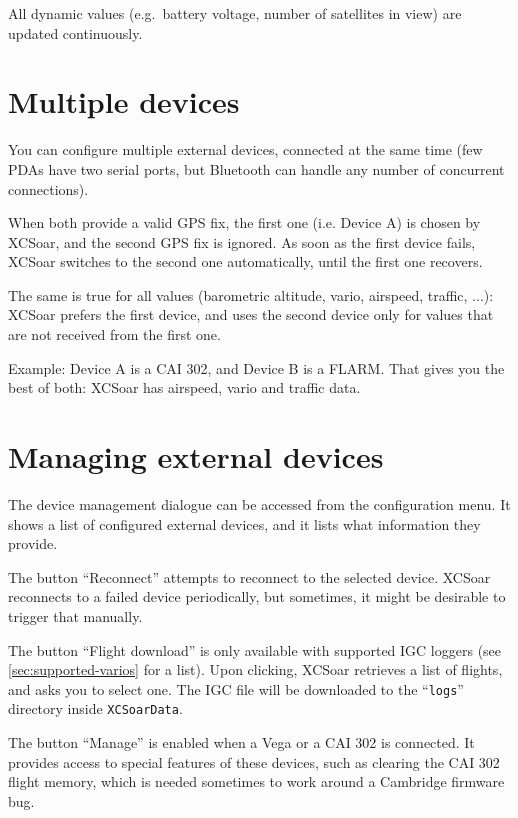 All dynamic values (e.g.\ battery voltage, number of satellites in
view) are updated continuously.

\section{Multiple devices}

You can configure multiple external devices, connected at the same
time (few PDAs have two serial ports, but Bluetooth can handle any
number of concurrent connections).

When both provide a valid GPS fix, the first one (i.e. Device A) is chosen by
XCSoar, and the second GPS fix is ignored.  As soon as the first device fails,
XCSoar switches to the second one automatically, until the first one recovers.

The same is true for all values (barometric altitude, vario, airspeed,
traffic, ...): XCSoar prefers the first device, and uses the second
device only for values that are not received from the first one.

Example: Device A is a CAI 302, and Device B is a FLARM.
That gives you the best of both: XCSoar has airspeed, vario and
traffic data.


\section{Managing external devices}

The device management dialogue can be accessed from the configuration
menu. It shows a list of configured external devices,
and it lists what information they provide.

The button ``Reconnect'' attempts to reconnect to the selected
device.  XCSoar reconnects to a failed device periodically, but
sometimes, it might be desirable to trigger that manually.

The button ``Flight download'' is only available with supported IGC
loggers (see \ref{sec:supported-varios} for a list).  Upon clicking,
XCSoar retrieves a list of flights, and asks you to select one.  The
IGC file will be downloaded to the ``\texttt{logs}'' directory inside
\texttt{XCSoarData}.

The button ``Manage'' is enabled when a Vega or a CAI 302 is
connected.  It provides access to special features of these devices,
such as clearing the CAI 302 flight memory, which is needed sometimes
to work around a Cambridge firmware bug.
